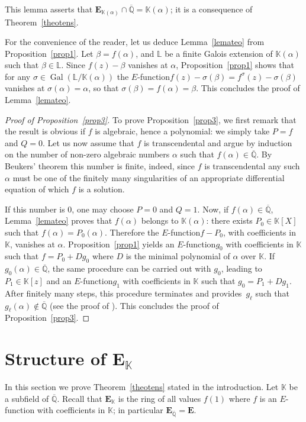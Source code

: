\documentclass[11pt]{article}
\numberwithin{equation}{section}
\newcommand{\Efunction}{$E$\nobreakdash-func\-tion\xspace}
\theoremstyle{definition}
\newcommand{\K}{\mathbb{K}}
\renewcommand{\L}{\mathbb{L}}
\newcommand{\EE}{{\mathbf E}}
\newcommand{\Qbar}{\overline{\mathbb Q}}
\newcommand{\EK}{\EE_{\K}}
\newcommand{\EQbar}{\EE_{\Qbar}}
\DeclareMathOperator{\Gal}{Gal}
\begin{document}
This lemma asserts that $\EE_{\K(\alpha)}\cap\Qbar=\K(\alpha)$; it is a consequence of Theorem~\ref{theotens}.

For the convenience of the reader, let us deduce Lemma~\ref{lemateo} from Proposition~\ref{prop1}. Let $\beta = f(\alpha)$, and $\L$ be a finite Galois extension of $\K(\alpha)$ such that $\beta\in\L$. Since $f(z)-\beta$ vanishes at $\alpha$, Proposition~\ref{prop1} shows that for any $\sigma\in \Gal(\L/\K(\alpha))$
the \Efunction $f(z)-\sigma(\beta) = f^\sigma(z)-\sigma(\beta) $ vanishes at $\sigma(\alpha)=\alpha$, so that $ \sigma(\beta) =f(\alpha) = \beta$.
This concludes the proof of Lemma~\ref{lemateo}.

\begin{proof}[Proof of Proposition~\ref{prop3}] To prove Proposition~\ref{prop3}, we first remark that the result is obvious if $f$ is algebraic, hence a polynomial: we simply take $P=f$ and $Q=0$. Let us now assume that $f$ is transcendental and argue by induction on the number of non-zero algebraic numbers $\alpha$ such that $f(\alpha)\in \Qbar$. By Beukers' theorem this number is finite, indeed, since $f$ is transcendental any such
$\alpha$ must be one of the finitely many singularities of an appropriate differential equation of which $f$ is a solution.

If this number is 0, one may choose $P=0$ and $Q=1$. Now, if $f(\alpha)\in \Qbar$, Lemma~\ref{lemateo} proves that $ f(\alpha)$ belongs to $\K(\alpha) $: there exists $P_0\in\K[X]$ such that $ f(\alpha) = P_0(\alpha)$. Therefore the \Efunction $f-P_0$, with coefficients in $\K$, vanishes at $\alpha$. Proposition~\ref{prop1} yields an \Efunction $g_0$ with coefficients in $\K$ such that $f = P_0 + D g_0$ where $D $ is the minimal polynomial of $\alpha$ over $\K$. If $g_0(\alpha)\in\Qbar$, the same procedure can be carried out with $g_0$, leading to $P_1\in\K[z]$ and an \Efunction $g_1$ with coefficients in $\K$ such that $g_0=P_1+Dg_1$. After finitely many steps, this procedure terminates and provides~$g_\ell$ such that $g_\ell(\alpha)\not\in\Qbar$ (see the proof of \cite[Th.\,3.4]{BRS2}). This concludes the proof of Proposition~\ref{prop3}. \end{proof}

\section{Structure of \texorpdfstring{$\EK$}{EK}} \label{sec5}

In this section we prove Theorem~\ref{theotens} stated in the introduction.
Let $\K$ be a subfield of $\Qbar$. Recall that $\EK$ is the ring of all values $f(1)$ where $f$ is an \Efunction with coefficients in $\K$; in particular $\EQbar = \EE$.
\end{document}
